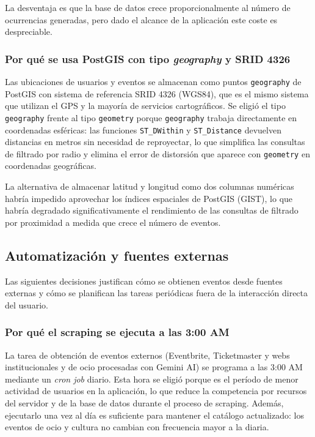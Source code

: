La desventaja es que la base de datos crece proporcionalmente al número de ocurrencias generadas, pero dado el alcance de la aplicación este coste es despreciable.

\subsubsection{Por qué se usa PostGIS con tipo \textit{geography} y SRID 4326}

Las ubicaciones de usuarios y eventos se almacenan como puntos \texttt{geography} de PostGIS con sistema de referencia SRID 4326 (WGS84), que es el mismo sistema que utilizan el GPS y la mayoría de servicios cartográficos. Se eligió el tipo \texttt{geography} frente al tipo \texttt{geometry} porque \texttt{geography} trabaja directamente en coordenadas esféricas: las funciones \texttt{ST\_DWithin} y \texttt{ST\_Distance} devuelven distancias en metros sin necesidad de reproyectar, lo que simplifica las consultas de filtrado por radio y elimina el error de distorsión que aparece con \texttt{geometry} en coordenadas geográficas.

La alternativa de almacenar latitud y longitud como dos columnas numéricas habría impedido aprovechar los índices espaciales de PostGIS (GIST), lo que habría degradado significativamente el rendimiento de las consultas de filtrado por proximidad a medida que crece el número de eventos.

\subsection{Automatización y fuentes externas}

Las siguientes decisiones justifican cómo se obtienen eventos desde fuentes externas y cómo se planifican las tareas periódicas fuera de la interacción directa del usuario.

\subsubsection{Por qué el scraping se ejecuta a las 3:00 AM}

La tarea de obtención de eventos externos (Eventbrite, Ticketmaster y webs institucionales y de ocio procesadas con Gemini AI) se programa a las 3:00 AM mediante un \textit{cron job} diario. Esta hora se eligió porque es el período de menor actividad de usuarios en la aplicación, lo que reduce la competencia por recursos del servidor y de la base de datos durante el proceso de scraping. Además, ejecutarlo una vez al día es suficiente para mantener el catálogo actualizado: los eventos de ocio y cultura no cambian con frecuencia mayor a la diaria.

